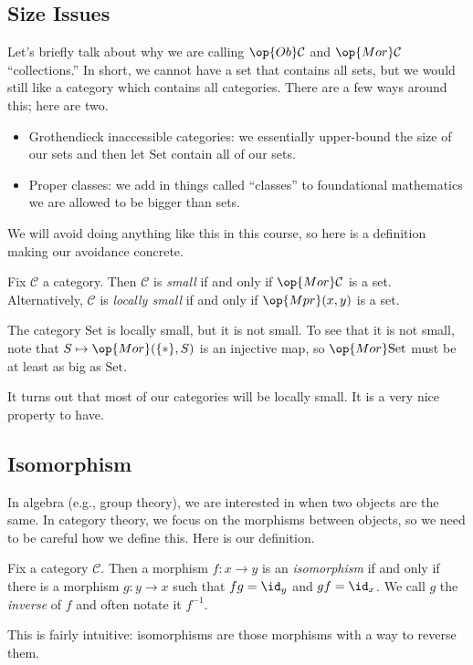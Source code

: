\subsection{Size Issues}
Let's briefly talk about why we are calling $\op{Ob}\mathcal C$ and $\op{Mor}\mathcal C$ ``collections.'' In short, we cannot have a set that contains all sets, but we would still like a category which contains all categories. There are a few ways around this; here are two.
\begin{itemize}
	\item Grothendieck inaccessible categories: we essentially upper-bound the size of our sets and then let $\mathrm{Set}$ contain all of our sets.
	\item Proper classes: we add in things called ``classes'' to foundational mathematics we are allowed to be bigger than sets.
\end{itemize}
We will avoid doing anything like this in this course, so here is a definition making our avoidance concrete.
\begin{definition}
	Fix $\mathcal C$ a category. Then $\mathcal C$ is \textit{small} if and only if $\op{Mor}\mathcal C$ is a set. Alternatively, $\mathcal C$ is \textit{locally small} if and only if $\op{Mpr}(x,y)$ is a set.
\end{definition}
\begin{example}
	The category $\mathrm{Set}$ is locally small, but it is not small. To see that it is not small, note that $S\mapsto\op{Mor}(\{*\},S)$ is an injective map, so $\op{Mor}\mathrm{Set}$ must be at least as big as $\mathrm{Set}$.
\end{example}
It turns out that most of our categories will be locally small. It is a very nice property to have.

\subsection{Isomorphism}
In algebra (e.g., group theory), we are interested in when two objects are the same. In category theory, we focus on the morphisms between objects, so we need to be careful how we define this. Here is our definition.
\begin{definition}[Isomorphism]
	Fix a category $\mathcal C$. Then a morphism $f:x\to y$ is an \textit{isomorphism} if and only if there is a morphism $g:y\to x$ such that $fg=\id_y$ and $gf=\id_x$. We call $g$ the \textit{inverse} of $f$ and often notate it $f^{-1}$.
\end{definition}
\noindent This is fairly intuitive: isomorphisms are those morphisms with a way to reverse them.

